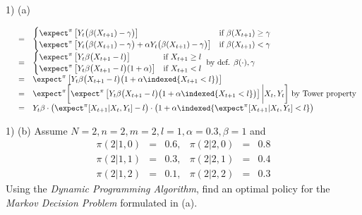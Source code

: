 \documentclass[11pt,a4paper]{article}
\begin{document}
\begin{answer}{1) (a)}
\begin{itemize}
\[\begin{array}{rcl}
      &=&\begin{cases}
        \expect^\pi\left[Y_t\big(\beta(X_{t+1})-\gamma\big)\right]&\text{if }\beta(X_{t+1})\geq\gamma\\
        \expect^\pi\left[Y_t\big(\beta(X_{t+1})-\gamma\big)+\alpha Y_t\big(\beta(X_{t+1})-\gamma\big)\right]&\text{if }\beta(X_{t+1})<\gamma
      \end{cases}\\
      &=&\begin{cases}
        \expect^\pi\left[Y_t\beta\big(X_{t+1}-l\big)\right]&\text{if }X_{t+1}\geq l\\
        \expect^\pi\left[Y_t\beta\big(X_{t+1}-l\big)(1+\alpha)\right]&\text{if }X_{t+1}<l
      \end{cases}\text{ by def. }\beta(\cdot),\gamma\\
      &=&\expect^\pi\left[Y_t\beta\big(X_{t+1}-l\big)\big(1+\alpha\indexed\{X_{t+1}<l\}\big)\right]\\
      &=&\expect^\pi\bigg[\expect^\pi\left[Y_t\beta\big(X_{t+1}-l\big)\big(1+\alpha\indexed\{X_{t+1}<l\}\big)\right]\bigg|X_t,Y_t\bigg]\text{ by Tower property}\\
      &=&Y_t\beta\cdot\big(\expect^\pi[X_{t+1}|X_t,Y_t]-l\big)\cdot\big(1+\alpha\indexed\{\expect^\pi[X_{t+1}|X_t,Y_t]<l\}\big)
    \end{array}\]
  \end{itemize}
\end{answer}

\begin{question}{1) (b)}
  Assume $N=2,n=2,m=2,l=1,\alpha=0.3,\beta=1$ and
  \[\begin{array}{rclrcl}
    \pi(2|1,0)&=&0.6,&\pi(2|2,0)&=&0.8\\
    \pi(2|1,1)&=&0.3,&\pi(2|2,1)&=&0.4\\
    \pi(2|1,2)&=&0.1,&\pi(2|2,2)&=&0.3
  \end{array}\]
  Using the \textit{Dynamic Programming Algorithm}, find an optimal policy for the \textit{Markov Decision Problem} formulated in (a).
\end{question}
\end{document}
